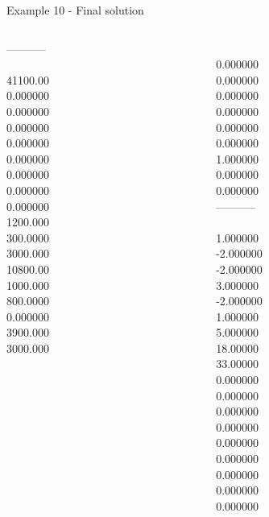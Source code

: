 \begin{frame}{Example 10 - Final solution}
\begin{columns}[t]
\begin{column}{0.3\textwidth}
-----------\\
\\
41100.00\\
0.000000\\
0.000000\\
0.000000\\
0.000000\\
0.000000\\
0.000000\\
0.000000\\
0.000000\\
1200.000\\
300.0000\\
3000.000\\
10800.00\\
1000.000\\
800.0000\\
0.000000\\
3900.000\\
3000.000\\

\end{column}  

\begin{column}{0.3\textwidth}
\\
0.000000\\
0.000000\\
0.000000\\
0.000000\\
0.000000\\
0.000000\\
1.000000\\
0.000000\\
0.000000\\

-----------\\
\\
1.000000\\
-2.000000\\
-2.000000\\
3.000000\\
-2.000000\\
1.000000\\
5.000000\\
18.00000\\
33.00000\\
0.000000\\
0.000000\\
0.000000\\
0.000000\\
0.000000\\
0.000000\\
0.000000\\
0.000000\\
0.000000\\

\end{column}
\end{columns}  
\end{frame}
